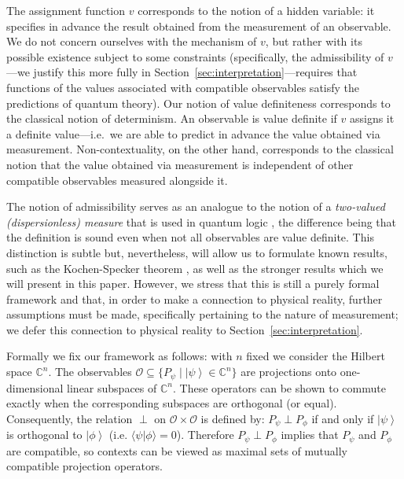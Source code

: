 \documentclass[%
 preprint,
 showpacs,
 showkeys,
 amsmath,
 amssymb,
 aps,
 pra,
 ]{revtex4-1}
\theoremstyle{definition}
\newcommand{\ket}[1]{\left| #1 \right>}
\newcommand{\iprod}[2]{\langle #1 | #2 \rangle}
\begin{document}
The assignment function $v$ corresponds to the notion of a hidden variable: it specifies in advance the result obtained from the measurement of an observable.
We do not concern ourselves with the mechanism of $v$, but rather with its possible existence subject to some constraints (specifically, the admissibility of $v$---we justify this more fully in Section~\ref{sec:interpretation}---requires that functions of the values associated with compatible observables satisfy the predictions of quantum theory).
Our notion of value definiteness corresponds to the classical notion of determinism.
An observable is value definite if $v$ assigns it a definite value---i.e.\ we are able to predict in advance the value obtained via measurement.
Non-contextuality, on the other hand, corresponds to the classical notion that the value obtained via measurement is independent of other compatible observables measured alongside it.

The notion of admissibility serves as an analogue to the notion of a \emph{two-valued (dispersionless) measure} that is used in quantum logic
\cite{ZirlSchl-65,kalmbach-86,Alda,Alda2,pulmannova-91,svozil-tkadlec},
the difference being that the definition is sound even when not all observables are value definite.
This distinction is subtle but, nevertheless, will allow us to formulate known results, such as the Kochen-Specker theorem
\cite{specker-60,kamber64,kamber65,ZirlSchl-65,kochen1,Alda,Alda2}, as well as the stronger results which we will present in this paper.
However, we stress that this is still a purely formal framework and that, in order to make a connection to physical reality, further assumptions must be made, specifically pertaining to the nature of measurement;
we defer this connection to physical reality to Section~\ref{sec:interpretation}.

Formally we fix our framework as follows: with $n$ fixed we consider the Hilbert space $\mathbb{C}^n$.
The observables $\mathcal{O} \subseteq \{ P_\psi \mid \ket{\psi} \in \mathbb{C}^n \}$ are projections onto one-dimensional linear subspaces of $\mathbb{C}^n$.
These operators can be shown to commute exactly when the corresponding subspaces are orthogonal (or equal).
Consequently, the relation $\perp$ on $\mathcal{O} \times \mathcal{O}$ is defined by: $P_\psi\perp P_\phi$ if and only if $\ket{\psi}$ is orthogonal to $\ket{\phi}$ (i.e. $\iprod{\psi}{\phi}=0$).
Therefore $P_\psi\perp P_\phi$ implies that $P_\psi$ and $P_\phi$ are compatible, so contexts can be viewed as maximal sets of mutually compatible projection operators.
\end{document}
